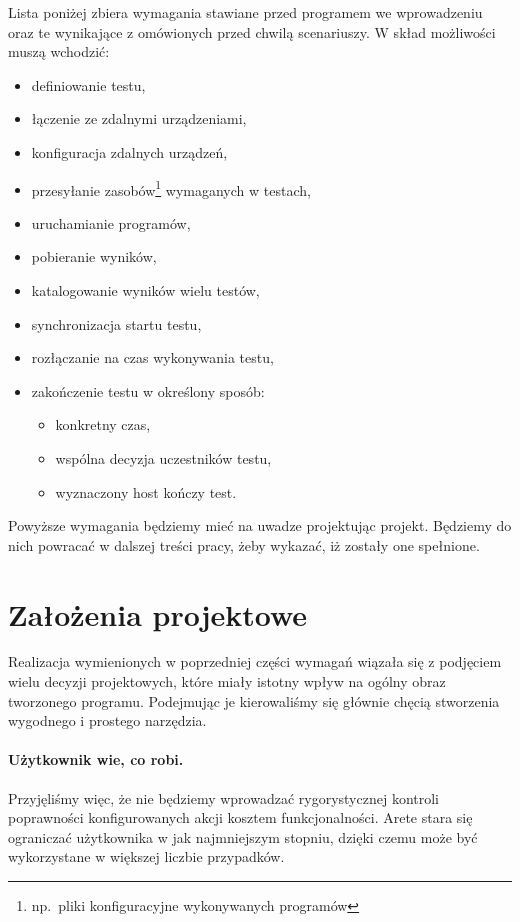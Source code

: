 \documentclass[00-praca-magisterska.tex]{subfiles}
\begin{document}
Lista poniżej zbiera wymagania stawiane przed programem we wprowadzeniu oraz te
wynikające z omówionych przed chwilą scenariuszy. W skład możliwości muszą wchodzić:
\begin{itemize}
\item definiowanie testu,
\item łączenie ze zdalnymi urządzeniami,
\item konfiguracja zdalnych urządzeń,
\item przesyłanie zasobów\footnote{np.~pliki konfiguracyjne wykonywanych programów} wymaganych w testach,
\item uruchamianie programów,
\item pobieranie wyników,
\item katalogowanie wyników wielu testów,
\item synchronizacja startu testu,
\item rozłączanie na czas wykonywania testu,
\item zakończenie testu w określony sposób:
  \begin{itemize}
  \item konkretny czas,
  \item wspólna decyzja uczestników testu,
  \item wyznaczony host kończy test.
  \end{itemize}
\end{itemize}

Powyższe wymagania będziemy mieć na uwadze projektując projekt. Będziemy do
nich powracać w dalszej treści pracy, żeby wykazać, iż zostały one spełnione.

\section{Założenia projektowe}
\label{arete-zalozenia}

Realizacja wymienionych w poprzedniej części wymagań wiązała się z podjęciem
wielu decyzji projektowych, które miały istotny wpływ na ogólny obraz tworzonego
programu.  Podejmując je kierowaliśmy się głównie chęcią stworzenia wygodnego i
prostego narzędzia.

\paragraph{Użytkownik wie, co robi.} Przyjęliśmy więc, że nie będziemy
wprowadzać rygorystycznej kontroli poprawności konfigurowanych akcji kosztem
funkcjonalności. Arete stara się ograniczać użytkownika w jak najmniejszym stopniu,
dzięki czemu może być wykorzystane w większej liczbie przypadków.
\end{document}
